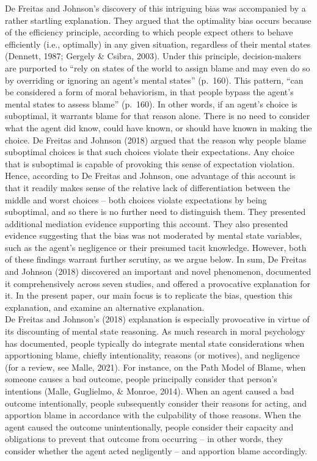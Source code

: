 \documentclass[
  man,floatsintext]{apa6}
\begin{document}
De Freitas and Johnson's discovery of this intriguing bias was accompanied by a rather startling explanation. They argued that the optimality bias occurs because of the efficiency principle, according to which people expect others to behave efficiently (i.e., optimally) in any given situation, regardless of their mental states (Dennett, 1987; Gergely \& Csibra, 2003). Under this principle, decision-makers are purported to ``rely on states of the world to assign blame and may even do so by overriding or ignoring an agent's mental states'' (p.~160). This pattern, ``can be considered a form of moral behaviorism, in that people bypass the agent's mental states to assess blame'' (p.~160). In other words, if an agent's choice is suboptimal, it warrants blame for that reason alone. There is no need to consider what the agent did know, could have known, or should have known in making the choice. De Freitas and Johnson (2018) argued that the reason why people blame suboptimal choices is that such choices violate their expectations. Any choice that is suboptimal is capable of provoking this sense of expectation violation. Hence, according to De Freitas and Johnson, one advantage of this account is that it readily makes sense of the relative lack of differentiation between the middle and worst choices -- both choices violate expectations by being suboptimal, and so there is no further need to distinguish them. They presented additional mediation evidence supporting this account. They also presented evidence suggesting that the bias was not moderated by mental state variables, such as the agent's negligence or their presumed tacit knowledge. However, both of these findings warrant further scrutiny, as we argue below. In sum, De Freitas and Johnson (2018) discovered an important and novel phenomenon, documented it comprehensively across seven studies, and offered a provocative explanation for it. In the present paper, our main focus is to replicate the bias, question this explanation, and examine an alternative explanation.\\
De Freitas and Johnson's (2018) explanation is especially provocative in virtue of its discounting of mental state reasoning. As much research in moral psychology has documented, people typically do integrate mental state considerations when apportioning blame, chiefly intentionality, reasons (or motives), and negligence (for a review, see Malle, 2021). For instance, on the Path Model of Blame, when someone causes a bad outcome, people principally consider that person's intentions (Malle, Guglielmo, \& Monroe, 2014). When an agent caused a bad outcome intentionally, people subsequently consider their reasons for acting, and apportion blame in accordance with the culpability of those reasons. When the agent caused the outcome unintentionally, people consider their capacity and obligations to prevent that outcome from occurring -- in other words, they consider whether the agent acted negligently -- and apportion blame accordingly.\\
\end{document}
